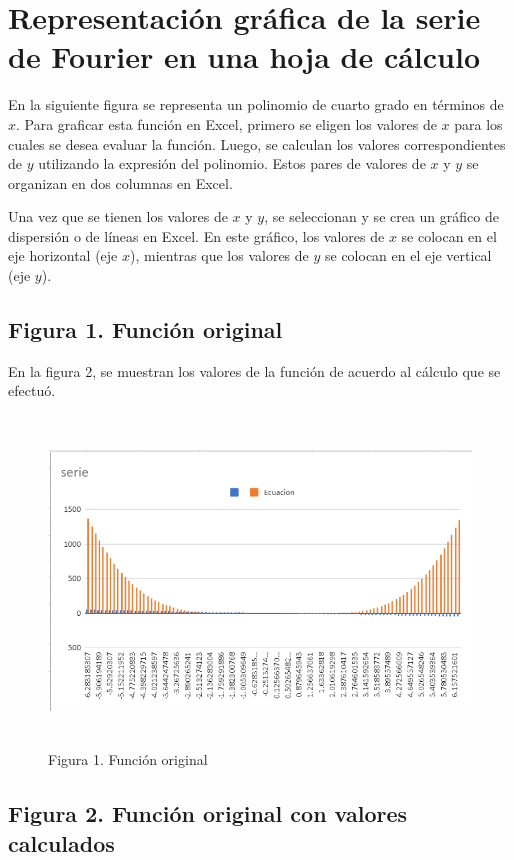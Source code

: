 \section{Representación gráfica de la serie de Fourier en una hoja de cálculo}

En la siguiente figura se representa un polinomio de cuarto grado en términos de \(x\). Para graficar esta función en Excel, primero se eligen los valores de \(x\) para los cuales se desea evaluar la función. Luego, se calculan los valores correspondientes de \(y\) utilizando la expresión del polinomio. Estos pares de valores de \(x\) y \(y\) se organizan en dos columnas en Excel.

Una vez que se tienen los valores de \(x\) y \(y\), se seleccionan y se crea un gráfico de dispersión o de líneas en Excel. En este gráfico, los valores de \(x\) se colocan en el eje horizontal (eje \(x\)), mientras que los valores de \(y\) se colocan en el eje vertical (eje \(y\)).

\subsection{Figura 1. Función original}

En la figura 2, se muestran los valores de la función de acuerdo al cálculo que se efectuó.

\begin{figure}[H]
	\centering
	\includegraphics[width=6.26772in,height=3.44444in]{media/image10.png}
	\caption{Figura 1. Función original}
\end{figure}

\subsection{Figura 2. Función original con valores calculados}

